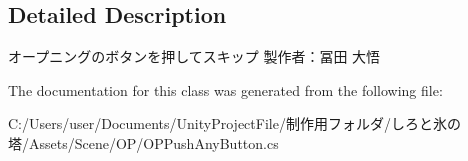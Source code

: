 \subsection{Detailed Description}
オープニングのボタンを押してスキップ 製作者：冨田 大悟 



The documentation for this class was generated from the following file\+:\begin{DoxyCompactItemize}
\item 
C\+:/\+Users/user/\+Documents/\+Unity\+Project\+File/制作用フォルダ/しろと氷の塔/\+Assets/\+Scene/\+O\+P/O\+P\+Push\+Any\+Button.\+cs\end{DoxyCompactItemize}
